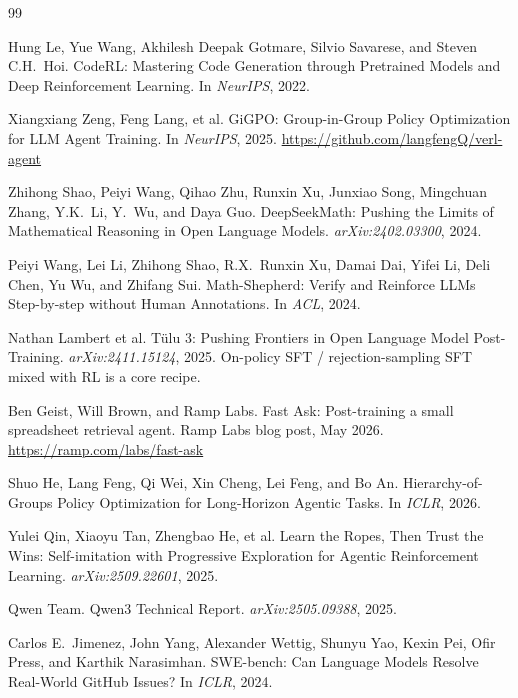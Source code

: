 \documentclass[10pt]{article}
\begin{document}

\begin{thebibliography}{99}

Hung Le, Yue Wang, Akhilesh Deepak Gotmare, Silvio Savarese, and Steven C.H.\ Hoi.
\newblock CodeRL: Mastering Code Generation through Pretrained Models and Deep
  Reinforcement Learning.
\newblock In \emph{NeurIPS}, 2022.

Xiangxiang Zeng, Feng Lang, et al.
\newblock GiGPO: Group-in-Group Policy Optimization for LLM Agent Training.
\newblock In \emph{NeurIPS}, 2025.
\newblock \url{https://github.com/langfengQ/verl-agent}

Zhihong Shao, Peiyi Wang, Qihao Zhu, Runxin Xu, Junxiao Song,
  Mingchuan Zhang, Y.K.\ Li, Y.\ Wu, and Daya Guo.
\newblock DeepSeekMath: Pushing the Limits of Mathematical Reasoning in Open
  Language Models.
\newblock \emph{arXiv:2402.03300}, 2024.

Peiyi Wang, Lei Li, Zhihong Shao, R.X.\ Runxin Xu, Damai Dai,
  Yifei Li, Deli Chen, Yu Wu, and Zhifang Sui.
\newblock Math-Shepherd: Verify and Reinforce LLMs Step-by-step without Human
  Annotations.
\newblock In \emph{ACL}, 2024.

Nathan Lambert et al.
\newblock T\"ulu 3: Pushing Frontiers in Open Language Model Post-Training.
\newblock \emph{arXiv:2411.15124}, 2025.
\newblock On-policy SFT / rejection-sampling SFT mixed with RL is a core recipe.

Ben Geist, Will Brown, and Ramp Labs.
\newblock Fast Ask: Post-training a small spreadsheet retrieval agent.
\newblock Ramp Labs blog post, May 2026.
\newblock \url{https://ramp.com/labs/fast-ask}

Shuo He, Lang Feng, Qi Wei, Xin Cheng, Lei Feng, and Bo An.
\newblock Hierarchy-of-Groups Policy Optimization for Long-Horizon Agentic Tasks.
\newblock In \emph{ICLR}, 2026.

Yulei Qin, Xiaoyu Tan, Zhengbao He, et al.
\newblock Learn the Ropes, Then Trust the Wins: Self-imitation with Progressive
  Exploration for Agentic Reinforcement Learning.
\newblock \emph{arXiv:2509.22601}, 2025.

Qwen Team.
\newblock Qwen3 Technical Report.
\newblock \emph{arXiv:2505.09388}, 2025.

Carlos E.\ Jimenez, John Yang, Alexander Wettig, Shunyu Yao, Kexin Pei,
  Ofir Press, and Karthik Narasimhan.
\newblock SWE-bench: Can Language Models Resolve Real-World GitHub Issues?
\newblock In \emph{ICLR}, 2024.


\end{thebibliography}
\end{document}
